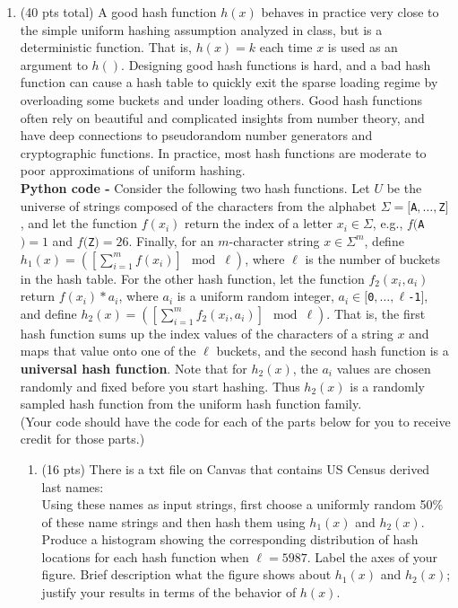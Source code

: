 \documentclass[12pt]{article}
\theoremstyle{remark}
\begin{document}
\begin{enumerate}
    
    \item (40 pts total) A good hash function $h(x)$ behaves in practice very close to the simple uniform hashing assumption analyzed in class, but is a deterministic function. That is, $h(x)=k$ each time $x$ is used as an argument to $h()$. Designing good hash functions is hard, and a bad hash function can cause a hash table to quickly exit the sparse loading regime by overloading some buckets and under loading others. Good hash functions often rely on beautiful and complicated insights from number theory, and have deep connections to pseudorandom number generators and cryptographic functions. In practice, most hash functions are moderate to poor approximations of uniform hashing.\\
	\textbf{Python code -} Consider the following two hash functions. Let $U$ be the universe of strings composed of the characters from the alphabet $\Sigma=[${\tt A}$,\dots,${\tt Z}$]$, and let the function $f(x_{i})$ return the index of a letter $x_{i}\in \Sigma$, e.g., $f(${\tt A}$)=1$ and $f(${\tt Z}$)=26$. Finally, for an $m$-character string $x\in \Sigma^{m}$, define $h_1(x) = \left(\left[\sum_{i=1}^{m}f(x_{i})\right]\!\! \mod \ell\right)$, where $\ell$ is the number of buckets in the hash table. For the other hash function,  let the function $f_2(x_{i}, a_{i})$ return $f(x_{i})*a_{i}$, where $a_{i}$ is a uniform random integer, $a_{i}\in [${\tt 0}$,\dots,${\tt $\ell$-1}$]$, and define $h_2(x) = \left(\left[\sum_{i=1}^{m}f_2(x_{i},a_{i})\right]\!\! \mod \ell\right)$. That is, the first hash function sums up the index values of the characters of a string $x$ and maps that value onto one of the $\ell$ buckets, and the second hash function is a \textbf{universal hash function}. Note that for $h_2(x)$, the $a_i$ values are chosen randomly and fixed before you start hashing. Thus $h_2(x)$ is a randomly sampled hash function from the uniform hash function family. \\
	(Your code should have the code for each of the parts below for you to receive credit for those parts.)
	
	\begin{enumerate}
	\item (16 pts) There is a txt file on Canvas that contains US Census derived last names: \\
	Using these names as input strings, first choose a uniformly random 50\% of these name strings and then hash them using $h_1(x)$ and $h_2(x)$. Produce a histogram showing the corresponding distribution of hash locations for each hash function when $\ell=5987$. Label the axes of your figure. Brief description what the figure shows about $h_1(x)$ and $h_2(x)$; justify your results in terms of the behavior of $h(x)$. 
	 

\end{enumerate}
\end{enumerate}
\end{document}
